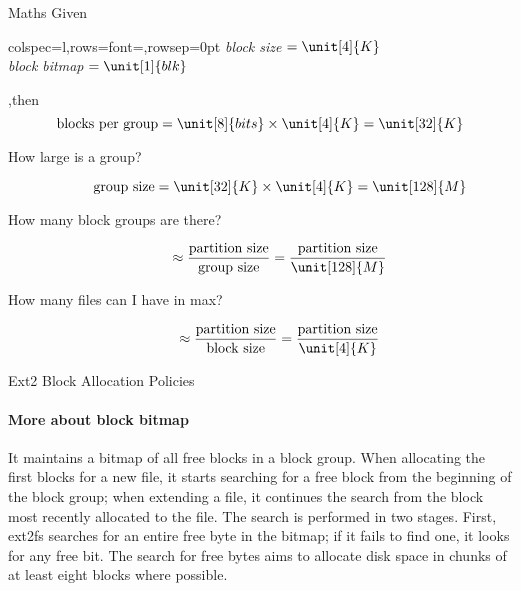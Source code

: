 \begin{frame}{Maths}
  Given \begin{tblr}{colspec={l},rows={font=\small},rowsep=0pt}
          \emph{block size} \(=\unit[4]{K}\) \\
          \emph{block bitmap} \(=\unit[1]{blk}\)\\
        \end{tblr},\quad{}then
      \[\text{blocks per group} = \unit[8]{bits}\times\unit[4]{K} = \unit[32]{K}\]  
  \begin{description}
  \item[How large is a group?]
    \[
      \text{group size} = \unit[32]{K}\times\unit[4]{K} = \unit[128]{M}
    \]
  \item[How many block groups are there?]
    \[
      \approx{}\frac{\text{partition size}}{\text{group size}} = %
      \frac{\text{partition size}}{\unit[128]{M}}
    \]
  \item[How many files can I have in max?]
    \[
      \approx{}\frac{\text{partition size}}{\text{block size}} = \frac{\text{partition
          size}}{\unit[4]{K}}
    \]
\end{description}
\end{frame}

\begin{frame}{Ext2 Block Allocation Policies}
  \label{fig:ext2blockalloc}%
  \centering%
  \mode<beamer>{ \texttt{[image: ext2blockalloc]} }%
\end{frame}

\paragraph{More about block bitmap}

It maintains a bitmap of all free blocks in a block group. When allocating the first
blocks for a new file, it starts searching for a free block from the beginning of the
block group; when extending a file, it continues the search from the block most recently
allocated to the file. The search is performed in two stages. First, ext2fs searches for
an entire free byte in the bitmap; if it fails to find one, it looks for any free bit.
The search for free bytes aims to allocate disk space in chunks of at least eight blocks
where possible.

